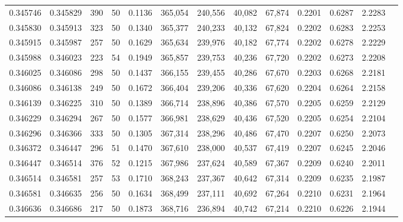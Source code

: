 \begin{tabular}{rrrrrrrrrrrrr}
0.345746 & 0.345829 &   390 &  50 &                                     0.1136 & 365,054 & 240,556 &  40,082 &  67,874 & 0.2201 & 0.6287 & 2.2283 \\
0.345830 & 0.345913 &   323 &  50 &                                     0.1340 & 365,377 & 240,233 &  40,132 &  67,824 & 0.2202 & 0.6283 & 2.2253 \\
0.345915 & 0.345987 &   257 &  50 &                                     0.1629 & 365,634 & 239,976 &  40,182 &  67,774 & 0.2202 & 0.6278 & 2.2229 \\
0.345988 & 0.346023 &   223 &  54 &                                     0.1949 & 365,857 & 239,753 &  40,236 &  67,720 & 0.2202 & 0.6273 & 2.2208 \\
0.346025 & 0.346086 &   298 &  50 &                                     0.1437 & 366,155 & 239,455 &  40,286 &  67,670 & 0.2203 & 0.6268 & 2.2181 \\
0.346086 & 0.346138 &   249 &  50 &                                     0.1672 & 366,404 & 239,206 &  40,336 &  67,620 & 0.2204 & 0.6264 & 2.2158 \\
0.346139 & 0.346225 &   310 &  50 &                                     0.1389 & 366,714 & 238,896 &  40,386 &  67,570 & 0.2205 & 0.6259 & 2.2129 \\
0.346229 & 0.346294 &   267 &  50 &                                     0.1577 & 366,981 & 238,629 &  40,436 &  67,520 & 0.2205 & 0.6254 & 2.2104 \\
0.346296 & 0.346366 &   333 &  50 &                                     0.1305 & 367,314 & 238,296 &  40,486 &  67,470 & 0.2207 & 0.6250 & 2.2073 \\
0.346372 & 0.346447 &   296 &  51 &                                     0.1470 & 367,610 & 238,000 &  40,537 &  67,419 & 0.2207 & 0.6245 & 2.2046 \\
0.346447 & 0.346514 &   376 &  52 &                                     0.1215 & 367,986 & 237,624 &  40,589 &  67,367 & 0.2209 & 0.6240 & 2.2011 \\
0.346514 & 0.346581 &   257 &  53 &                                     0.1710 & 368,243 & 237,367 &  40,642 &  67,314 & 0.2209 & 0.6235 & 2.1987 \\
0.346581 & 0.346635 &   256 &  50 &                                     0.1634 & 368,499 & 237,111 &  40,692 &  67,264 & 0.2210 & 0.6231 & 2.1964 \\
0.346636 & 0.346686 &   217 &  50 &                                     0.1873 & 368,716 & 236,894 &  40,742 &  67,214 & 0.2210 & 0.6226 & 2.1944 \\

\end{tabular}
